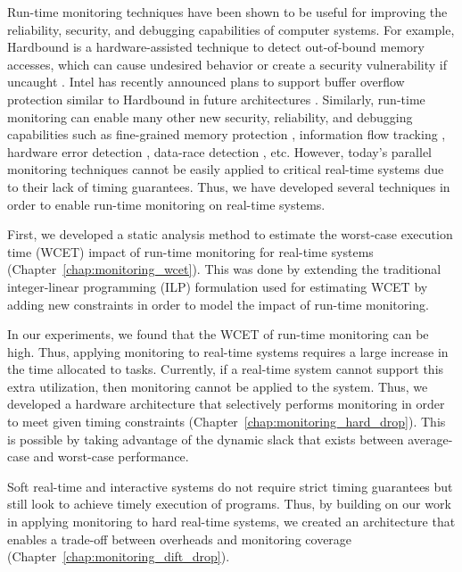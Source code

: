 Run-time monitoring techniques have been shown to be useful for improving the
reliability, security, and debugging capabilities of computer systems. For
example, Hardbound is a hardware-assisted technique to detect out-of-bound
memory accesses, which can cause undesired behavior or create a security
vulnerability if uncaught \cite{hardbound-asplos08}. Intel has recently
announced plans to support buffer overflow protection similar to Hardbound in
future architectures \cite{intel-mpx}. Similarly, run-time monitoring can
enable many other new security, reliability, and debugging capabilities such as
fine-grained memory protection \cite{mondrian-asplos02}, information flow
tracking \cite{dift-asplos04, testudo-micro08}, hardware error detection
\cite{argus-micro07}, data-race detection \cite{radish-isca12, cord-hpca06},
etc.  However, today's parallel monitoring techniques cannot be easily applied
to critical real-time systems due to their lack of timing guarantees. Thus, we
have developed several techniques in order to enable run-time monitoring on
real-time systems.

First, we developed a static analysis method to estimate the worst-case
execution time (WCET) impact of run-time monitoring for real-time systems
(Chapter~\ref{chap:monitoring_wcet}). This was done by extending the
traditional integer-linear programming (ILP) formulation used for estimating
WCET by adding new constraints in order to model the impact of run-time
monitoring.

In our experiments, we found that the WCET of run-time monitoring can be high.
Thus, applying monitoring to real-time systems requires a large increase in the
time allocated to tasks. Currently, if a real-time system cannot support this
extra utilization, then monitoring cannot be applied to the system.  Thus, we
developed a hardware architecture that selectively performs monitoring in order
to meet given timing constraints (Chapter~\ref{chap:monitoring_hard_drop}).
This is possible by taking advantage of the dynamic slack that exists between
average-case and worst-case performance.

Soft real-time and interactive systems do not require strict timing guarantees
but still look to achieve timely execution of programs. Thus, by building on
our work in applying monitoring to hard real-time systems, we created an
architecture that enables a trade-off between overheads and monitoring coverage
(Chapter~\ref{chap:monitoring_dift_drop}). 

